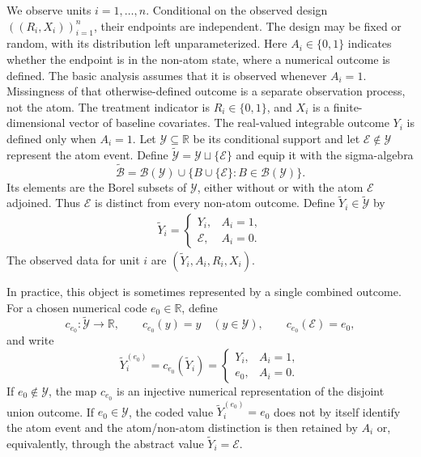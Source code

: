\documentclass[11pt]{article}
\begin{document}
We observe units $i=1,\ldots,n$. Conditional on the observed design $((R_i,X_i))_{i=1}^n$, their endpoints are independent. The design may be fixed or random, with its distribution left unparameterized. Here $A_i\in\{0,1\}$ indicates whether the endpoint is in the non-atom state, where a numerical outcome is defined. The basic analysis assumes that it is observed whenever $A_i=1$. Missingness of that otherwise-defined outcome is a separate observation process, not the atom. The treatment indicator is $R_i\in\{0,1\}$, and $X_i$ is a finite-dimensional vector of baseline covariates. The real-valued integrable outcome $Y_i$ is defined only when $A_i=1$. Let $\mathcal{Y}\subseteq\mathbb{R}$ be its conditional support and let $\mathcal{E}\notin\mathcal{Y}$ represent the atom event. Define $\widetilde{\mathcal{Y}}=\mathcal{Y}\sqcup\{\mathcal{E}\}$ and equip it with the sigma-algebra
\[
\widetilde{\mathcal{B}}
  =\mathcal{B}(\mathcal{Y})
  \cup\{B\cup\{\mathcal{E}\}\colon B\in\mathcal{B}(\mathcal{Y})\}.
\]
Its elements are the Borel subsets of $\mathcal{Y}$, either without or with the atom $\mathcal{E}$ adjoined. Thus $\mathcal{E}$ is distinct from every non-atom outcome. Define $\widetilde{Y}_i\in\widetilde{\mathcal{Y}}$ by
\begin{align*}
  \widetilde{Y}_i
  =
  \begin{cases}
    Y_i, & A_i=1,\\
    \mathcal{E}, & A_i=0.
  \end{cases}
\end{align*}
The observed data for unit $i$ are $(\widetilde{Y}_i,A_i,R_i,X_i)$.

In practice, this object is sometimes represented by a single combined outcome. For a chosen numerical code $e_0\in\mathbb{R}$, define
\[
  c_{e_0}:\widetilde{\mathcal{Y}}\to\mathbb{R},
  \qquad
  c_{e_0}(y)=y \quad (y\in\mathcal{Y}),
  \qquad
  c_{e_0}(\mathcal{E})=e_0,
\]
and write
\[
  \widetilde{Y}_i^{(e_0)}
  =c_{e_0}(\widetilde{Y}_i)
  =
  \begin{cases}
    Y_i, & A_i=1,\\
    e_0, & A_i=0.
  \end{cases}
\]
If $e_0\notin\mathcal{Y}$, the map $c_{e_0}$ is an injective numerical representation of the disjoint union outcome. If $e_0\in\mathcal{Y}$, the coded value $\widetilde{Y}_i^{(e_0)}=e_0$ does not by itself identify the atom event and the atom/non-atom distinction is then retained by $A_i$ or, equivalently, through the abstract value $\widetilde{Y}_i=\mathcal{E}$. 
\end{document}
